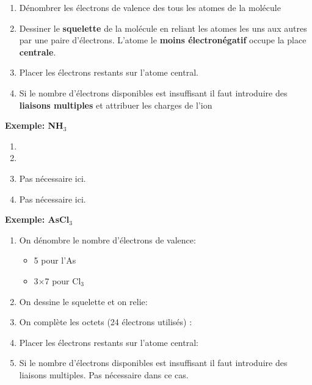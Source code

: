 \documentclass[10pt,a4paper]{book}
\begin{document}
\begin{enumerate}
\item Dénombrer les électrons de valence des tous les atomes de la molécule
\item Dessiner le \textbf{squelette} de la molécule en reliant les atomes les uns aux autres par une paire d'électrons. L'atome le \textbf{moins électronégatif} occupe la place \textbf{centrale}.
\item Placer les électrons restants sur l'atome central.
\item Si le nombre d'électrons disponibles est insuffisant il faut introduire des \textbf{liaisons multiples} et attribuer les charges de l'ion
\end{enumerate}
\textbf{Exemple: NH$_3$}
\begin{center}
\begin{enumerate}
\item {}
\item {}
\item Pas nécessaire ici.
\item Pas nécessaire ici.
\end{enumerate}
\end{center}
\textbf{Exemple: AsCl$_3$}
\begin{enumerate}
\item On dénombre le nombre d'électrons de valence:
\begin{itemize}
	\item 5 pour l'As
	\item 3$\times$7 pour Cl$_3$
\end{itemize}
\item On dessine le squelette et on relie: 
\item On complète les octets (24 électrons utilisés) : 
\item Placer les électrons restants sur l'atome central: 
\item Si le nombre d'électrons disponibles est insuffisant il faut introduire des liaisons multiples. Pas nécessaire dans ce cas.
\end{enumerate}
\end{document}
